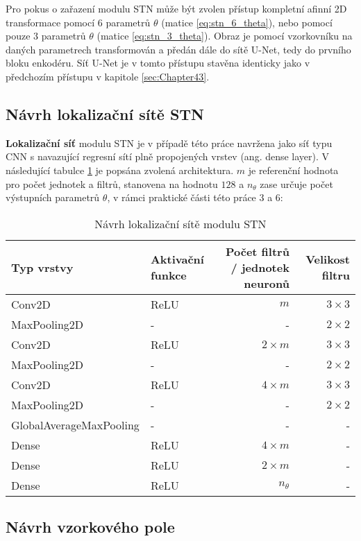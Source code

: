 Pro pokus o zařazení modulu STN může být zvolen přístup kompletní afinní 2D transformace pomocí 6 parametrů $\theta$ (matice \ref{eq:stn_6_theta}), nebo pomocí pouze 3 parametrů $\theta$ (matice \ref{eq:stn_3_theta}). Obraz je pomocí vzorkovníku na daných parametrech transformován a předán dále do sítě U-Net, tedy do prvního bloku enkodéru. Síť U-Net je v tomto přístupu stavěna identicky jako v předchozím přístupu v kapitole \ref{sec:Chapter43}.

\subsection{Návrh lokalizační sítě STN}

\textbf{Lokalizační síť} modulu STN je v případě této práce navržena jako síť typu CNN s navazující regresní sítí plně propojených vrstev (ang. dense layer). V následující tabulce \ref{fig:stn_loc_net} je popsána zvolená architektura. $m$ je referenční hodnota pro počet jednotek a filtrů, stanovena na hodnotu $128$ a $n_{\theta}$ zase určuje počet výstupních parametrů $\theta$, v rámci praktické části této práce $3$ a $6$:

\begin{table}[H]
\centering
\begin{tabular}{@{}llrr@{}}
\toprule
Typ vrstvy & Aktivační funkce & Počet filtrů / jednotek neuronů & Velikost filtru \\ \midrule
Conv2D & ReLU & $m$ & $3 \times 3$ \\
MaxPooling2D & - & - & $2 \times 2$ \\
Conv2D & ReLU & $2\times m$ & $3 \times 3$ \\
MaxPooling2D & - & - & $2 \times 2$ \\
Conv2D & ReLU & $4\times m$ & $3 \times 3$ \\
MaxPooling2D & - & - & $2 \times 2$ \\
GlobalAverageMaxPooling & - & - & - \\
\bottomrule
Dense & ReLU & $4\times m$ & - \\
Dense & ReLU & $2\times m$ & - \\
Dense & ReLU & $n_{\theta}$ & - \\
\bottomrule
\end{tabular}
\caption[Návrh lokalizační sítě modulu STN] { Návrh lokalizační sítě modulu STN }
\label{fig:stn_loc_net}
\end{table}

\subsection{Návrh vzorkového pole}

